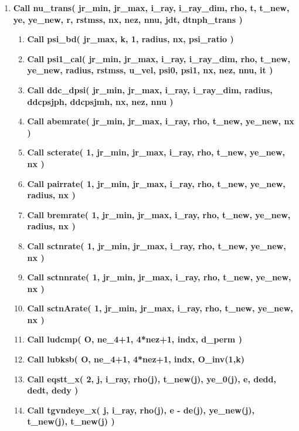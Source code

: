 \documentclass[11pt,doublespace]{article}
\begin{document}
\begin{itemize}
\begin{enumerate}
\begin{enumerate}
\begin{enumerate}
\item {\bf Call nu\_trans( jr\_min, jr\_max, i\_ray, i\_ray\_dim, rho, t, t\_new, ye, ye\_new, r, rstmss, nx, nez, nnu, jdt, dtnph\_trans )}\\

\begin{enumerate}

\item {\bf Call psi\_bd( jr\_max, k, 1, radius, nx, psi\_ratio )}

\item {\bf Call psi1\_cal( jr\_min, jr\_max, i\_ray, i\_ray\_dim, rho, t\_new, ye\_new, radius,  rstmss, u\_vel, psi0, psi1, nx, nez, nnu, it )}

\item {\bf Call ddc\_dpsi( jr\_min, jr\_max, i\_ray, i\_ray\_dim, radius, ddcpsjph, ddcpsjmh, nx, nez, nnu )}

\item {\bf Call abemrate( jr\_min, jr\_max, i\_ray, rho, t\_new, ye\_new, nx )}

\item {\bf Call scterate( 1, jr\_min, jr\_max, i\_ray, rho, t\_new, ye\_new, nx )}

\item {\bf Call pairrate( 1, jr\_min, jr\_max, i\_ray, rho, t\_new, ye\_new, radius, nx )}

\item {\bf Call bremrate( 1, jr\_min, jr\_max, i\_ray, rho, t\_new, ye\_new, radius, nx )}

\item {\bf Call sctnrate( 1, jr\_min, jr\_max, i\_ray, rho, t\_new, ye\_new, nx )}

\item {\bf Call sctnnrate( 1, jr\_min, jr\_max, i\_ray, rho, t\_new, ye\_new, nx )}

\item {\bf Call sctnArate( 1, jr\_min, jr\_max, i\_ray, rho, t\_new, ye\_new, nx )}

\item {\bf Call ludcmp( O, ne\_4+1, 4*nez+1, indx, d\_perm )}

\item {\bf Call lubksb( O, ne\_4+1, 4*nez+1, indx, O\_inv(1,k)}

\item {\bf Call eqstt\_x( 2, j, i\_ray, rho(j), t\_new(j), ye\_0(j), e, dedd, dedt, dedy )}

\item {\bf Call tgvndeye\_x( j, i\_ray, rho(j), e - de(j), ye\_new(j), t\_new(j), t\_new(j) )}


\end{enumerate}
\end{enumerate}
\end{enumerate}
\end{enumerate}
\end{itemize}
\end{document}
